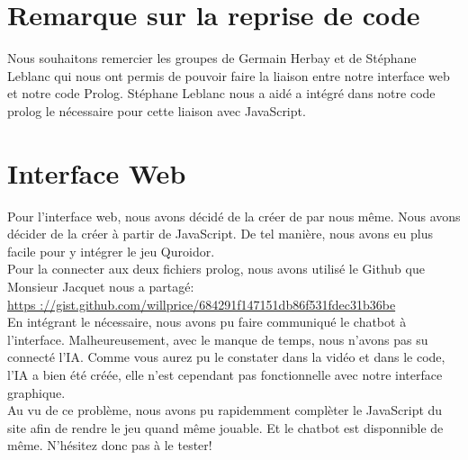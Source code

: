 \documentclass{article}
\begin{document}
\section{Remarque sur la reprise de code}
Nous souhaitons remercier les groupes de Germain Herbay et de Stéphane Leblanc qui nous ont permis de pouvoir faire la liaison entre notre interface web et notre code Prolog. Stéphane Leblanc nous a aidé a intégré dans notre code prolog le nécessaire pour cette liaison avec JavaScript.
\pagebreak
\section{Interface Web}
Pour l'interface web, nous avons décidé de la créer de par nous même. Nous avons décider de la créer à partir de JavaScript. De tel manière, nous avons eu plus facile pour y intégrer le jeu Quroidor. 
\\
Pour la connecter aux deux fichiers prolog, nous avons utilisé le Github que Monsieur Jacquet nous a partagé: 
\\
\url{https ://gist.github.com/willprice/684291f147151db86f531fdec31b36be}
\\
En intégrant le nécessaire, nous avons pu faire communiqué le chatbot à l'interface. Malheureusement, avec le manque de temps, nous n'avons pas su connecté l'IA. Comme vous aurez pu le constater dans la vidéo et dans le code, l'IA a bien été créée, elle n'est cependant pas fonctionnelle avec notre interface graphique.
\\
Au vu de ce problème, nous avons pu rapidemment complèter le JavaScript du site afin de rendre le jeu quand même jouable. Et le chatbot est disponnible de même. N'hésitez donc pas à le tester!
\pagebreak
\end{document}
